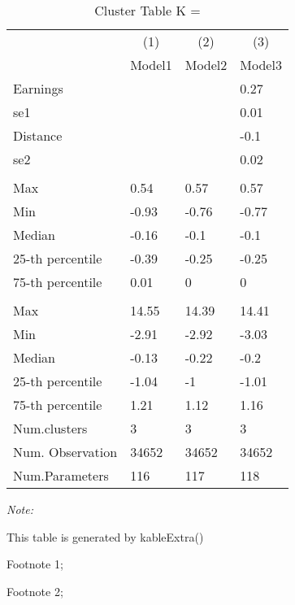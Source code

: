 \begin{table}
\centering
\caption{Cluster Table K = }
\centering
\begin{threeparttable}
\begin{tabular}[t]{llll}
\toprule
\multicolumn{1}{c}{ } & \multicolumn{1}{c}{(1)} & \multicolumn{1}{c}{(2)} & \multicolumn{1}{c}{(3)} \\
\cmidrule(l{3pt}r{3pt}){2-2} \cmidrule(l{3pt}r{3pt}){3-3} \cmidrule(l{3pt}r{3pt}){4-4}
 & Model1 & Model2 & Model3\\
\midrule
Earnings &  &  & 0.27\\
se1 &  &  & 0.01\\
Distance &  &  & -0.1\\
se2 &  &  & 0.02\\
\addlinespace[0.3em]
\multicolumn{4}{l}{\textit{\textbf{Panel A: }}}\\
\hspace{1em}Max & 0.54 & 0.57 & 0.57\\
\hspace{1em}Min & -0.93 & -0.76 & -0.77\\
\hspace{1em}Median & -0.16 & -0.1 & -0.1\\
\hspace{1em}25-th percentile & -0.39 & -0.25 & -0.25\\
\hspace{1em}75-th percentile & 0.01 & 0 & 0\\
\addlinespace[0.3em]
\multicolumn{4}{l}{\textit{\textbf{Panel B: }}}\\
\hspace{1em}Max & 14.55 & 14.39 & 14.41\\
\hspace{1em}Min & -2.91 & -2.92 & -3.03\\
\hspace{1em}Median & -0.13 & -0.22 & -0.2\\
\hspace{1em}25-th percentile & -1.04 & -1 & -1.01\\
\hspace{1em}75-th percentile & 1.21 & 1.12 & 1.16\\
Num.clusters & 3 & 3 & 3\\
Num. Observation & 34652 & 34652 & 34652\\
Num.Parameters & 116 & 117 & 118\\
\bottomrule
\end{tabular}
\begin{tablenotes}
\item \textit{Note: } 
\item This table is generated by kableExtra()
\item[1] Footnote 1; 
\item[2] Footnote 2; 
\end{tablenotes}
\end{threeparttable}
\end{table}
